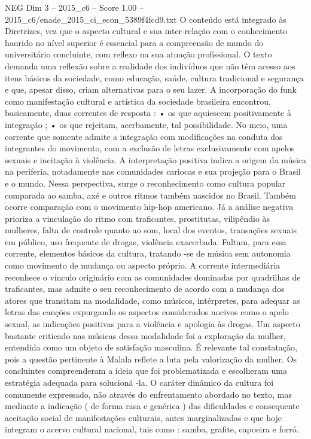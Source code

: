 \begin{textsample}{NEG Dim 3 – 2015\_c6 – Score 1.00 – 2015\_c6/enade\_2015\_ci\_econ\_5389f4fcd9.txt}
O conteúdo está integrado às Diretrizes, vez que o aspecto cultural e sua inter-relação com o conhecimento haurido no nível superior é essencial para a compreensão de mundo do universitário concluinte, com reflexo na sua atuação profissional.
O texto demanda uma reflexão sobre a realidade dos indivíduos que não têm acesso aos itens básicos da sociedade, como educação, saúde, cultura tradicional e segurança e que, apesar disso, criam alternativas para o seu lazer.
A incorporação do funk como manifestação cultural e artística da sociedade brasileira encontrou, basicamente, duas correntes de resposta : • os que aquiescem positivamente à integração ; • os que rejeitam, acerbamente, tal possibilidade.
No meio, uma corrente que somente admite a integração com modificações na conduta dos integrantes do movimento, com a exclusão de letras exclusivamente com apelos sexuais e incitação à violência.
A interpretação positiva indica a origem da música na periferia, notadamente nas comunidades cariocas e sua projeção para o Brasil e o mundo.
Nessa perspectiva, surge o reconhecimento como cultura popular comparada ao samba, axé e outros ritmos também nascidos no Brasil.
Também ocorre comparação com o movimento hip-hop americano.
Já a análise negativa prioriza a vinculação do ritmo com traficantes, prostitutas, vilipêndio às mulheres, falta de controle quanto ao som, local dos eventos, transações sexuais em público, uso frequente de drogas, violência exacerbada.
Faltam, para essa corrente, elementos básicos da cultura, tratando -se de música sem autonomia como movimento de mudança ou aspecto próprio.
A corrente intermediária reconhece o vínculo originário com as comunidades dominadas por quadrilhas de traficantes, mas admite o seu reconhecimento de acordo com a mudança dos atores que transitam na modalidade, como músicos, intérpretes, para adequar as letras das canções expurgando os aspectos considerados nocivos como o apelo sexual, as indicações positivas para a violência e apologia às drogas.
Um aspecto bastante criticado nas músicas dessa modalidade foi a exploração da mulher, entendida como um objeto de satisfação masculina.
É relevante tal constatação, pois a questão pertinente à Malala reflete a luta pela valorização da mulher.
Os concluintes compreenderam a ideia que foi problematizada e escolheram uma estratégia adequada para solucioná -la.
O caráter dinâmico da cultura foi comumente expressado, não através do enfrentamento abordado no texto, mas mediante a indicação ( de forma rasa e genérica ) das dificuldades e consequente aceitação social de manifestações culturais, antes marginalizadas e que hoje integram o acervo cultural nacional, tais como : samba, grafite, capoeira e forró.

\end{textsample}
